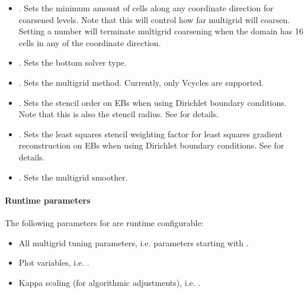 \documentclass[letterpaper,10pt,english]{sphinxmanual}
\begin{document}
\begin{itemize}
\item {} 
\sphinxAtStartPar
{}.
Sets the minimum amount of cells along any coordinate direction for coarsened levels.
Note that this will control how far multigrid will coarsen. Setting a number  will terminate multigrid coarsening when the domain has 16 cells in any of the coordinate direction.

\item {} 
\sphinxAtStartPar
{}.
Sets the bottom solver type.

\item {} 
\sphinxAtStartPar
{}.
Sets the multigrid method.
Currently, only V\sphinxhyphen{}cycles are supported.

\item {} 
\sphinxAtStartPar
{}.
Sets the stencil order on EBs when using Dirichlet boundary conditions.
Note that this is also the stencil radius.
See {\hyperref[\detokenize{Source/LinearSolvers:chap-linearsolvers}]{}} for details.

\item {} 
\sphinxAtStartPar
{}.
Sets the least squares stencil weighting factor for least squares gradient reconstruction on EBs when using Dirichlet boundary conditions.
See {\hyperref[\detokenize{Utilities/LeastSquares:chap-leastsquares}]{}} for details.

\item {} 
\sphinxAtStartPar
{}.
Sets the multigrid smoother.

\end{itemize}


\paragraph{Runtime parameters}
\label{\detokenize{Solvers/RTE:runtime-parameters}}
\sphinxAtStartPar
The following parameters for  are run\sphinxhyphen{}time configurable:
\begin{itemize}
\item {} 
\sphinxAtStartPar
All multigrid tuning parameters, i.e. parameters starting with .

\item {} 
\sphinxAtStartPar
Plot variables, i.e. .

\item {} 
\sphinxAtStartPar
Kappa scaling (for algorithmic adjustments), i.e. .

\end{itemize}
\end{document}
